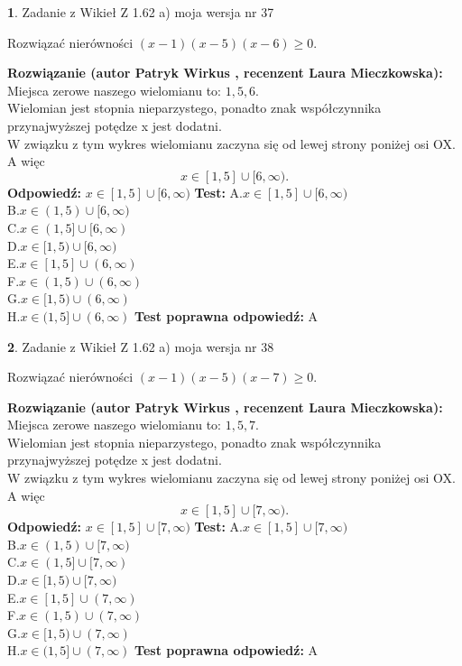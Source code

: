 \documentclass[12pt, a4paper]{article}
\theoremstyle{definition} %
\newtheorem{zad}{}
\newcommand{\zadStart}[1]{\begin{zad}#1\newline}
\newcommand{\zadStop}{\end{zad}}
\newcommand{\rozwStart}[2]{\noindent \textbf{Rozwiązanie (autor #1 , recenzent #2): }\newline}
\newcommand{\rozwStop}{\newline}
\newcommand{\odpStart}{\noindent \textbf{Odpowiedź:}\newline}
\newcommand{\odpStop}{\newline}
\newcommand{\testStart}{\noindent \textbf{Test:}\newline}
\newcommand{\testStop}{\newline}
\newcommand{\kluczStart}{\noindent \textbf{Test poprawna odpowiedź:}\newline}
\newcommand{\kluczStop}{\newline}
\begin{document}
\zadStart{Zadanie z Wikieł Z 1.62 a) moja wersja nr 37}

Rozwiązać nierówności $(x-1)(x-5)(x-6)\ge0$.
\zadStop
\rozwStart{Patryk Wirkus}{Laura Mieczkowska}
Miejsca zerowe naszego wielomianu to: $1, 5, 6$.\\
Wielomian jest stopnia nieparzystego, ponadto znak współczynnika przy\linebreak najwyższej potędze x jest dodatni.\\ W związku z tym wykres wielomianu zaczyna się od lewej strony poniżej osi OX. A więc $$x \in [1,5] \cup [6,\infty).$$
\rozwStop
\odpStart
$x \in [1,5] \cup [6,\infty)$
\odpStop
\testStart
A.$x \in [1,5] \cup [6,\infty)$\\
B.$x \in (1,5) \cup [6,\infty)$\\
C.$x \in (1,5] \cup [6,\infty)$\\
D.$x \in [1,5) \cup [6,\infty)$\\
E.$x \in [1,5] \cup (6,\infty)$\\
F.$x \in (1,5) \cup (6,\infty)$\\
G.$x \in [1,5) \cup (6,\infty)$\\
H.$x \in (1,5] \cup (6,\infty)$
\testStop
\kluczStart
A
\kluczStop



\zadStart{Zadanie z Wikieł Z 1.62 a) moja wersja nr 38}

Rozwiązać nierówności $(x-1)(x-5)(x-7)\ge0$.
\zadStop
\rozwStart{Patryk Wirkus}{Laura Mieczkowska}
Miejsca zerowe naszego wielomianu to: $1, 5, 7$.\\
Wielomian jest stopnia nieparzystego, ponadto znak współczynnika przy\linebreak najwyższej potędze x jest dodatni.\\ W związku z tym wykres wielomianu zaczyna się od lewej strony poniżej osi OX. A więc $$x \in [1,5] \cup [7,\infty).$$
\rozwStop
\odpStart
$x \in [1,5] \cup [7,\infty)$
\odpStop
\testStart
A.$x \in [1,5] \cup [7,\infty)$\\
B.$x \in (1,5) \cup [7,\infty)$\\
C.$x \in (1,5] \cup [7,\infty)$\\
D.$x \in [1,5) \cup [7,\infty)$\\
E.$x \in [1,5] \cup (7,\infty)$\\
F.$x \in (1,5) \cup (7,\infty)$\\
G.$x \in [1,5) \cup (7,\infty)$\\
H.$x \in (1,5] \cup (7,\infty)$
\testStop
\kluczStart
A
\kluczStop
\end{document}
